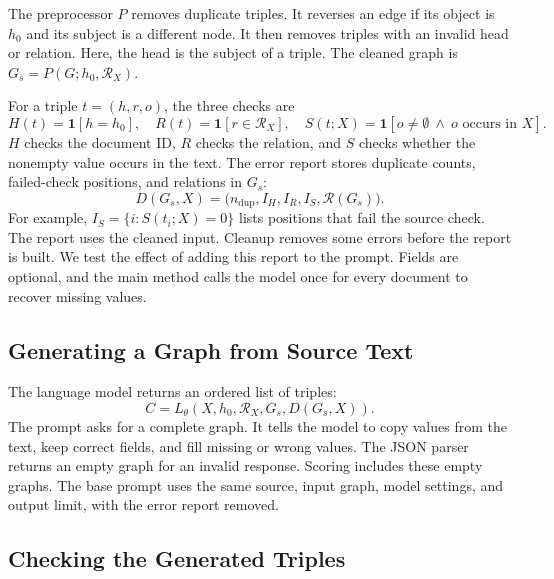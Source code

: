 The preprocessor $P$ removes duplicate triples. It reverses an edge if its
object is $h_0$ and its subject is a different node. It then removes triples
with an invalid head or relation. Here, the head is the subject of a triple.
The cleaned graph is $G_s=P(G;h_0,\mathcal R_X)$.

For a triple $t=(h,r,o)$, the three checks are
\begin{equation}
    \label{eq:diagnostic_predicates}
    H(t)=\mathbf1[h=h_0],\quad
    R(t)=\mathbf1[r\in\mathcal R_X],\quad
    S(t;X)=\mathbf1[o\ne\emptyset\ \wedge\ o\text{ occurs in }X].
\end{equation}
$H$ checks the document ID, $R$ checks the relation, and $S$ checks whether
the nonempty value occurs in the text.
The error report stores duplicate counts, failed-check positions,
and relations in $G_s$:
\begin{equation}
    \label{eq:diagnostic_context}
    D(G_s,X)=\big(n_{\mathrm{dup}},I_H,I_R,I_S,\mathcal R(G_s)\big).
\end{equation}
For example, $I_S=\{i:S(t_i;X)=0\}$ lists positions that fail the source
check. The report uses the cleaned input. Cleanup removes some errors
before the report is built. We test the effect of adding this report to the
prompt. Fields are optional, and the main method calls the model once for
every document to recover missing values.

\subsection{Generating a Graph from Source Text}
\label{sec:framework:architecture}

The language model returns an ordered list of triples:
\begin{equation}
    \label{eq:proposal_generation}
    C=L_\theta(X,h_0,\mathcal R_X,G_s,D(G_s,X)).
\end{equation}
The prompt asks for a complete graph. It tells the model to copy values from
the text, keep correct fields, and fill missing or wrong values.
The JSON parser returns an empty graph for an invalid response.
Scoring includes these empty graphs. The base prompt uses the same source,
input graph, model settings, and output limit, with the error report removed.

\subsection{Checking the Generated Triples}
\label{sec:framework:constraints}

